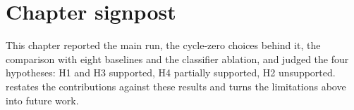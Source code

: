 \section{Chapter signpost}
\label{sec:ch5-signpost}

This chapter reported the main run, the cycle-zero choices behind it, the comparison with eight baselines and the classifier ablation, and judged the four hypotheses: H1 and H3 supported, H4 partially supported, H2 unsupported.  restates the contributions against these results and turns the limitations above into future work.
